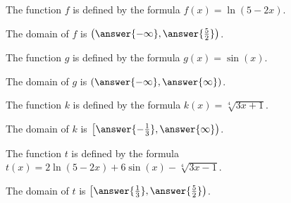 \documentclass{ximera}
\author{Bobby Ramsey}
\begin{document}
\begin{exercise} 
	The function $f$ is defined by the formula $f(x)=\ln(5-2x)$.
	\begin{center}
		The domain of $f$ is $\left(\answer{-\infty},\answer{\frac{5}{2}}\right)$.
	\end{center}
\end{exercise}

\begin{exercise} 
	The function $g$ is defined by the formula $g(x)=\sin(x)$.
	\begin{center}
		The domain of $g$ is $\left(\answer{-\infty}, \answer{\infty}\right)$.
	\end{center}
\end{exercise}

\begin{exercise} 
	The function $k$ is defined by the formula $k(x)=\sqrt[4]{3x+1}$.
	\begin{center}
		The domain of $k$ is $\left[\answer{-\frac{1}{3}}, \answer{\infty}\right)$.
	\end{center}
\end{exercise}

\begin{exercise} 
	The function $t$ is defined by the formula $t(x)=2\ln(5-2x)+6\sin(x)-\sqrt[4]{3x-1}$.
	\begin{center}
		The domain of $t$ is $\left[\answer{\frac{1}{3}}, \answer{\frac{5}{2}}\right)$.
	\end{center}
\end{exercise}
\end{document}
